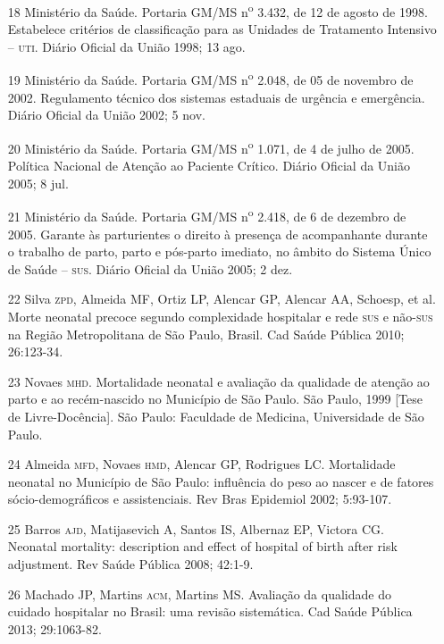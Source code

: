 \documentclass{article}
\begin{document}
\begin{itemize}
\item[18] Ministério da Saúde. Portaria GM/MS
n\textsuperscript{o}
3.432, de 12 de agosto de 1998.
Estabelece critérios de classificação para as Unidades de Tratamento Intensivo –
\textsc{uti}. Diário Oficial da União 1998; 13 ago.

\item[19] Ministério da Saúde. Portaria GM/MS
n\textsuperscript{o}
2.048, de 05 de novembro de 2002.
Regulamento técnico dos sistemas estaduais de urgência e emergência. Diário
Oficial da União 2002; 5 nov.

\item[20] Ministério da Saúde. Portaria GM/MS
n\textsuperscript{o}
1.071, de 4 de julho de 2005. Política
Nacional de Atenção ao Paciente Crítico. Diário Oficial da União 2005; 8
jul.

\item[21] Ministério da Saúde. Portaria GM/MS
n\textsuperscript{o}
2.418, de 6 de dezembro de 2005.
Garante às parturientes o direito à presença de acompanhante durante o trabalho
de parto, parto e pós-parto imediato, no âmbito do Sistema Único de Saúde – \textsc{sus}.
Diário Oficial da União 2005; 2 dez.

\item[22] Silva \textsc{zpd}, Almeida MF, Ortiz LP, Alencar GP, Alencar AA, Schoesp,
et al. Morte neonatal precoce segundo complexidade hospitalar e rede \textsc{sus} e
não-\textsc{sus} na Região Metropolitana de São Paulo, Brasil. Cad Saúde Pública 2010;
26:123-34.

\item[23] Novaes \textsc{mhd}. Mortalidade neonatal e avaliação da qualidade de
atenção ao parto e ao recém-nascido no Município de São Paulo. São Paulo, 1999
[Tese de Livre-Docência]. São Paulo: Faculdade de Medicina, Universidade de São
Paulo.

\item[24] Almeida \textsc{mfd}, Novaes \textsc{hmd}, Alencar GP, Rodrigues LC. Mortalidade
neonatal no Município de São Paulo: influência do peso ao nascer e de fatores
sócio-demográficos e assistenciais. Rev Bras Epidemiol 2002;
5:93-107.

\item[25] Barros \textsc{ajd}, Matijasevich A, Santos IS, Albernaz EP, Victora CG.
Neonatal mortality: description and effect of hospital of birth after risk
adjustment. Rev Saúde Pública 2008; 42:1-9.

\item[26] Machado JP, Martins \textsc{acm}, Martins MS. Avaliação da qualidade do
cuidado hospitalar no Brasil: uma revisão sistemática. Cad Saúde Pública 2013;
29:1063-82.


\end{itemize}
\end{document}
